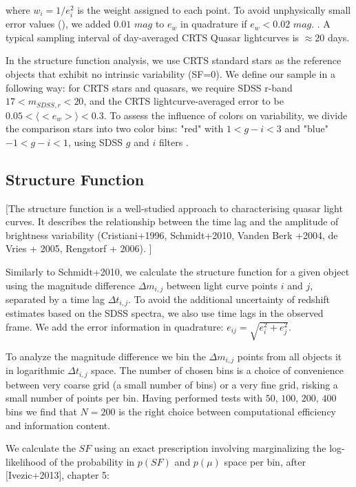 \documentclass[fleqn,usenatbib]{mnras}  %
\begin{document}
where $ w_{i} = 1 / e_{i}^{2}$ is the weight assigned to each point. To avoid unphysically small error values (), we added  $0.01$ $mag$ to $e_{w}$ in quadrature if $e_{w}<0.02$ $mag$.  . A typical sampling interval of day-averaged CRTS Quasar lightcurves is $\approx 20$ days. 

In the structure function analysis, we use CRTS standard stars as the reference objects that exhibit no intrinsic variability (SF=0).  We define our sample in a following way: for CRTS stars and quasars, we require SDSS  r-band $17< m_{SDSS,r} < 20$, and the CRTS lightcurve-averaged error  to be   $0.05 < \langle <e_{w}> \rangle < 0.3$. To assess the influence of colors on variability,  we divide the comparison stars into two color bins: "red" with   $1 < g-i < 3$ and "blue" $-1 < g-i < 1$,  using SDSS $g$ and $i$ filters .

\subsection{Structure Function}

[The structure function is a well-studied approach to characterising quasar light curves. It describes the relationship between the time lag and the amplitude of brightness variability (Cristiani+1996, Schmidt+2010, Vanden Berk +2004, de Vries + 2005, Rengstorf + 2006). ]

Similarly to Schmidt+2010, we  calculate the structure function for a given object  using  the magnitude difference $\Delta m _{i,j}$ between light curve points $i$ and $j$, separated by a time lag $\Delta t_{i,j}$. To avoid the additional uncertainty of redshift estimates based on the SDSS spectra, we also use time lags in the observed frame. We add the error information in quadrature: $e_{ij} = \sqrt{e_{i}^{2}+e_{j}^{2}}$. 

To analyze the magnitude difference  we bin the $\Delta m _{i,j}$ points from all objects  it in logarithmic $\Delta t_{i,j}$  space. The number of chosen bins is a choice of convenience between very coarse grid (a small number of bins) or a very fine grid, risking a small number of points per bin. Having performed tests  with $50$, $100$, $200$, $400$ bins we find that $N=200$ is the right choice between computational efficiency and information content. 

We calculate the $SF$ using an exact prescription involving marginalizing the log-likelihood of the probability in $p(SF)$ and $p(\mu)$ space per bin, after [Ivezic+2013], chapter 5: 
 
\end{document}
